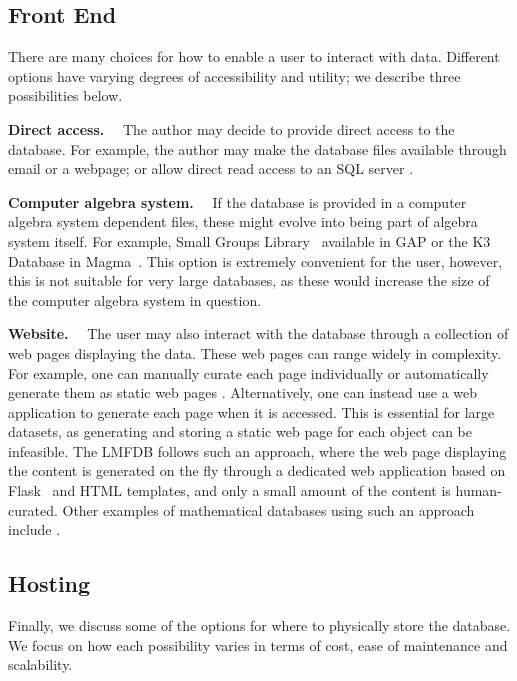\documentclass{amsart}
\newcommand{\subhead}[1]{\vspace{0.1in} \noindent \textbf{#1.}\ \ }
\begin{document}
\subsection{Front End}

There are many choices for how to enable a user to interact with data.
Different options have varying degrees of accessibility and utility; we describe three possibilities below.

\subhead{Direct access}
    The author may decide to provide direct access to the database.
    For example, the author may make the database files available through email or a webpage; or
    allow direct read access to an SQL server \cite{umrk}.

\subhead{Computer algebra system}
    If the database is provided in a computer algebra system dependent files, these might evolve into being part of algebra system itself.
    For example, Small Groups Library~\cite{smallgroups} available in GAP or the K3 Database in Magma~\cite{magmadb}.
    This option is extremely convenient for the user, however, this is not suitable for very large databases, as these would increase the size of the computer algebra system in question.

\subhead{Website}
    The user may also interact with the database through a collection of web pages displaying the data.
    These web pages can range widely in complexity.
    For example, one can manually curate each page individually \cites{cantorsattic, fanosearch} or automatically generate them as static web pages \cites{etc, graphclasses, SyzygyData, knotinfo, groupnames}.
    Alternatively, one can instead use a web application to generate each page when it is accessed.
    This is essential for large datasets, as generating and storing a static web page for each object can be infeasible.
    The LMFDB follows such an approach, where the web page displaying the content is generated on the fly through a dedicated web application based on Flask~\cite{flask} and HTML templates, and only a small amount of the content is human-curated.
    Other examples of mathematical databases using such an approach include \cites{knotatlas, hog}.

\subsection{Hosting}

Finally, we discuss some of the options for where to physically store the database.
We focus on how each possibility varies in terms of cost, ease of maintenance and scalability. 
\end{document}
